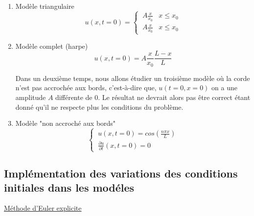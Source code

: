 \begin{enumerate}
    \item Modèle triangulaire
    \begin{equation}
       u(x,t=0)=\left\{
            \begin{array}{ll}
               \ A \frac{x}{x_{0}} &  x\leq x_{0} \\
               \ A \frac{x}{x_{0}} &  x\leq x_{0}
            \end{array}
        \right.
    \end{equation}
    
    
    \item Modèle complet (harpe)
    \begin{equation}
        u(x,t=0)=A\frac{x}{x_{0}}\frac{L-x}{L}
    \end{equation}
    
Dans un deuxième temps, nous allons étudier un troisième modèle où la corde n'est pas accrochée aux bords, c'est-à-dire que, $u(t=0,x=0)$ on a une amplitude $A$ différente de $0$. Le résultat ne devrait alors pas être correct étant donné qu'il ne respecte plus les conditions du problème.
\newline

 \item Modèle "non accroché aux bords"
    \begin{equation}
       \left\{
            \begin{array}{ll}
               \  u(x,t=0)=cos(\frac{n \pi x}{L})  \\
               \ \frac{\partial{u}}{\partial{t}}(x,t=0)=0 
            \end{array}
        \right.
    \end{equation}
    
    
    
    
    
    
\end{enumerate}


\vspace*{2cm}
\subsection{Implémentation des variations des conditions initiales dans les modéles}


\underline{Méthode d'Euler explicite}



